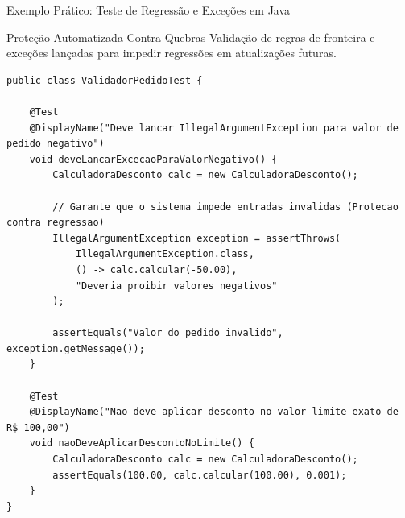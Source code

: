 \documentclass[aspectratio=169, 9pt]{beamer}
\begin{document}
\begin{frame}[fragile]{Exemplo Prático: Teste de Regressão e Exceções em Java}
  \begin{block}{Proteção Automatizada Contra Quebras}
    Validação de regras de fronteira e exceções lançadas para impedir regressões em atualizações futuras.
  \end{block}

  \begin{lstlisting}[style=javastyle]
public class ValidadorPedidoTest {

    @Test
    @DisplayName("Deve lancar IllegalArgumentException para valor de pedido negativo")
    void deveLancarExcecaoParaValorNegativo() {
        CalculadoraDesconto calc = new CalculadoraDesconto();

        // Garante que o sistema impede entradas invalidas (Protecao contra regressao)
        IllegalArgumentException exception = assertThrows(
            IllegalArgumentException.class,
            () -> calc.calcular(-50.00),
            "Deveria proibir valores negativos"
        );

        assertEquals("Valor do pedido invalido", exception.getMessage());
    }

    @Test
    @DisplayName("Nao deve aplicar desconto no valor limite exato de R$ 100,00")
    void naoDeveAplicarDescontoNoLimite() {
        CalculadoraDesconto calc = new CalculadoraDesconto();
        assertEquals(100.00, calc.calcular(100.00), 0.001);
    }
}
  \end{lstlisting}
\end{frame}
\end{document}

